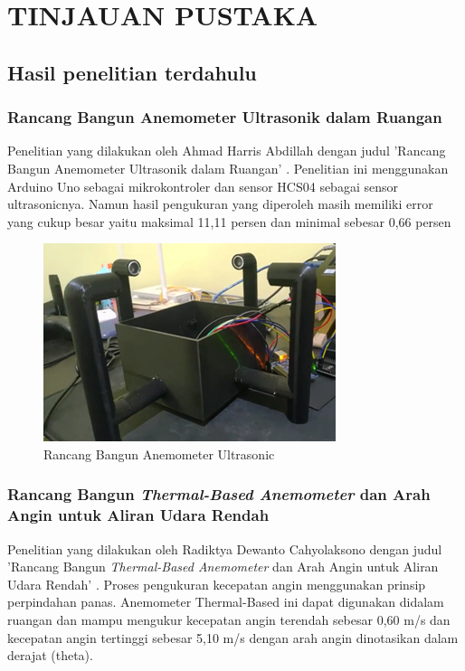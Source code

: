\section{TINJAUAN PUSTAKA}

\subsection{Hasil penelitian terdahulu}
\subsubsection{Rancang Bangun Anemometer Ultrasonik dalam Ruangan}

Penelitian yang dilakukan oleh Ahmad Harris Abdillah dengan judul 'Rancang Bangun Anemometer 
Ultrasonik dalam Ruangan' \parencite{Abdillah2022}. Penelitian ini menggunakan Arduino Uno sebagai mikrokontroler
dan sensor HCS04 sebagai sensor ultrasonicnya. Namun hasil pengukuran yang diperoleh
masih memiliki error yang cukup besar yaitu maksimal 11,11 persen dan minimal sebesar 0,66 persen

\begin{figure}[h!]
	\centering
	\includegraphics[width=0.7\linewidth]{gambar/fig_anemometer_abdillah_prototipe}
	\caption{Rancang Bangun Anemometer Ultrasonic \parencite{Abdillah2022}}
	\label{abdillah_anemo_prototipe}
\end{figure}

\subsubsection{Rancang Bangun \emph{Thermal-Based Anemometer} dan Arah Angin untuk Aliran Udara Rendah}

Penelitian yang dilakukan oleh Radiktya Dewanto Cahyolaksono dengan judul 'Rancang Bangun \emph{Thermal-Based Anemometer} dan Arah Angin untuk 
Aliran Udara Rendah' \parencites{Cahyolaksono2022}. Proses pengukuran kecepatan angin menggunakan prinsip perpindahan panas. Anemometer Thermal-Based
ini dapat digunakan didalam ruangan dan mampu mengukur kecepatan angin terendah sebesar 0,60 m/s dan kecepatan angin
tertinggi sebesar 5,10 m/s dengan arah angin dinotasikan dalam derajat (theta).

